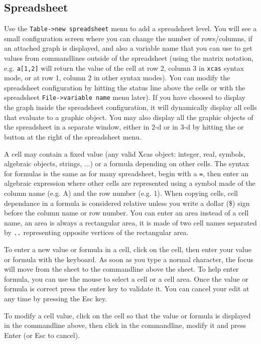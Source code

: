 \documentclass{article}
\begin{document}
\subsection{Spreadsheet}
Use the \verb|Table->new spreadsheet| menu to add a spreadsheet level.
You will see a small configuration screen where you can change
the number of rows/columns, if an attached graph is displayed,
and also a variable name that you can use to get values
from commandlines outside of the spreadsheet (using the matrix notation,
e.g. {\tt a[1,2]} will return the value of the cell at row 2, column 3
in {\tt xcas} syntax mode, or at row 1, column 2 in other syntax modes). 
You can modify the spreadsheet configuration by hitting the
status line above the cells or with the 
spreadsheet \verb|File->variable name| menu later).
If you have choosed to display the graph inside the spreadsheet
configuration, it will dynamically
display all cells that evaluate to a graphic object. 
You may also display all the graphic
objects of the spreadsheet in a separate window, either in 2-d or in 3-d by 
hitting the  or  button at the right of 
the spreadsheet menu.

A cell may contain
a fixed value (any valid Xcas object: integer, real, symbols,
algebraic objects, strings, ...) or a formula depending on other
cells. The syntax for formulas is the same as for many spreadsheet, 
begin with a \verb|=|, then enter an algebraic expression where
other cells are represented using a symbol made of the column
name (e.g. A) and the row number (e.g. 1). When copying cells,
cell dependance in a formula is considered relative
unless you write a dollar (\$) sign before the column name or
row number. You can enter an area instead of a cell name, an area
is always a rectangular area, it is made of two cell names separated
by \verb|..| representing opposite vertices of the rectangular area.

To enter a new value or formula in a cell, click on the cell, then
enter your value or formula with the keyboard. As soon as you type
a normal character, the focus will move from the sheet to the
commandline above the sheet. To help enter formula, you can use the mouse 
to select a cell or a cell area. Once the value or formula is correct
press the enter key to validate it. You can cancel your edit at
any time by pressing the Esc key.

To modify a cell value, click on the cell so that the value or formula
is displayed in the commandline above, then click in the commandline,
modify it and press Enter (or Esc to cancel).
\end{document}
